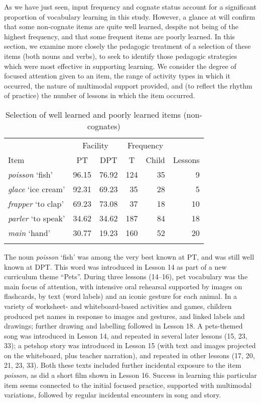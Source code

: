 \documentclass[output=paper]{langscibook}
\begin{document}
As we have just seen, input frequency and cognate status account for a significant proportion of vocabulary learning in this study. However, a glance at  will confirm that some non-cognate items are quite well learned, despite not being of the highest frequency, and that some frequent items are poorly learned. In this section, we examine more closely the pedagogic treatment of a selection of these items (both nouns and verbs), to seek to identify those pedagogic strategies which were most effective in supporting learning. We consider the degree of focused attention given to an item, the range of activity types in which it occurred, the nature of multimodal support provided, and (to reflect the rhythm of practice) the number of lessons in which the item occurred.

\vfill
\begin{table}[H]
\caption{\label{tab:mitchell:4}Selection of well learned and poorly learned items (non-cognates)}
    \begin{tabular}{lrrrrr}
    \lsptoprule
    & \multicolumn{2}{c}{Facility} & \multicolumn{2}{c}{Frequency} & \\\cmidrule(lr){2-3}\cmidrule(lr){4-5}
    Item &	\multicolumn{1}{c}{PT} &	\multicolumn{1}{c}{DPT} &	\multicolumn{1}{c}{T} &	\multicolumn{1}{c}{Child} & {Lessons}\\\midrule
    \textit{poisson} `fish' &	96.15 &	76.92 &	124 &	35 &	9\\
    \textit{glace} `ice cream' &	92.31 &	69.23 &	35 &	28 &	5\\
    \textit{frapper} `to clap' &	69.23 &	73.08 &	37 &	18 &	10\\
    \textit{parler} `to speak' &	34.62 &	34.62 &	187 &	84 &	18\\
    \textit{main} `hand' &	30.77 &	19.23 &	160 &	52 &	20\\
    \lspbottomrule
    \end{tabular}
\end{table}
\vfill\pagebreak

The noun \textit{poisson} `fish' was among the very best known at PT, and was still well known at DPT. This word was introduced in Lesson 14 as part of a new curriculum theme ``Pets''. During three lessons (14--16), pet vocabulary was the main focus of attention, with intensive oral rehearsal supported by images on flashcards, by text (word labels) and an iconic gesture for each animal. In a variety of worksheet- and whiteboard-based activities and games, children produced pet names in response to images and gestures, and linked labels and drawings; further drawing and labelling followed in Lesson 18. A pets-themed song was introduced in Lesson 14, and repeated in several later lessons (15, 23, 33); a petshop story was introduced in Lesson 15 (with text and images projected on the whiteboard, plus teacher narration), and repeated in other lessons (17, 20, 21, 23, 33). Both these texts included further incidental exposure to the item \textit{poisson}, as did a short film shown in Lesson 16. Success in learning this particular item seems connected to the initial focused practice, supported with multimodal variations, followed by regular incidental encounters in song and story.
\end{document}
